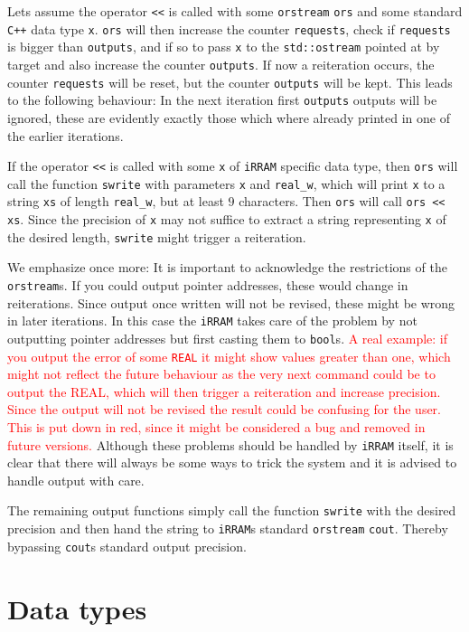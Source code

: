 \documentclass{article}
\newcommand{\irram}{\texttt{iRRAM}\xspace}
\newcommand{\irrams}{\texttt{iRRAM}s\xspace}
\newcommand{\cc}{\texttt{C++}\xspace}
\newcommand{\ir}[1]{\texttt{#1}}
\newcommand{\code}[1]{\texttt{#1}}
\newcommand{\temp}[1]{\textcolor{red}{#1}}
\begin{document}
Lets assume the operator \code{<<} is called with some \ir{orstream} \code{ors} and some standard \cc data type \code{x}. \code{ors} will then increase the counter \code{requests}, check if \code{requests} is bigger than \code{outputs}, and if so to pass \code{x} to the \ir{std::ostream} pointed at by target and also increase the counter \code{outputs}. If now a reiteration occurs, the counter \code{requests} will be reset, but the counter \code{outputs} will be kept. This leads to the following behaviour: In the next iteration first \code{outputs} outputs will be ignored, these are evidently exactly those which where already printed in one of the earlier iterations.

If the operator \code{<<} is called with some \code{x} of \irram specific data type, then \code{ors} will call the function \ir{swrite} with parameters \code{x} and \ir{real\_w}, which will print \code{x} to a string \code{xs} of length \ir{real\_w}, but at least $9$ characters. Then \code{ors} will call \code{ors << xs}. Since the precision of \code{x} may not suffice to extract a string representing \code{x} of the desired length, \ir{swrite} might trigger a reiteration.

We emphasize once more: It is important to acknowledge the restrictions of the \ir{orstream}s. If you could output pointer addresses, these would change in reiterations. Since output once written will not be revised, these might be wrong in later iterations. In this case the \irram takes care of the problem by not outputting pointer addresses but first casting them to \code{bool}s. \temp{A real example: if you output the error of some \ir{REAL} it might show values greater than one, which might not reflect the future behaviour as the very next command could be to output the REAL, which will then trigger a reiteration and increase precision. Since the output will not be revised the result could be confusing for the user. This is put down in red, since it might be considered a bug and removed in future versions.} Although these problems should be handled by \irram itself, it is clear that there will always be some ways to trick the system and it is advised to handle output with care.

The remaining output functions simply call the function \ir{swrite} with the desired precision and then hand the string to \irrams standard \ir{orstream} \ir{cout}. Thereby bypassing \ir{cout}s standard output precision.


\section{Data types}
\end{document}
